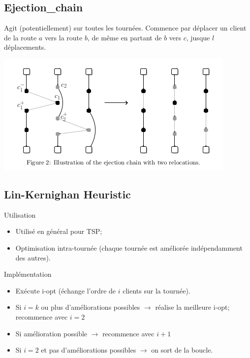 \documentclass{beamer}
\begin{document}
\subsection{Ejection\_chain}
\begin{frame}
Agit (potentiellement) sur toutes les tournées. Commence par déplacer un client de la route $a$ vers la route $b$, de même en partant de $b$ vers $c$, jusque $l$ déplacements. 

	\centering
	\includegraphics[height=0.4\textheight]{ejection_chain.png}
\end{frame}


\subsection{Lin-Kernighan Heuristic}
\begin{frame}

\begin{block}{Utilisation}
\begin{itemize}
\item Utilisé en général pour TSP;
\item Optimisation intra-tournée (chaque tournée est améliorée indépendamment des autres).
\end{itemize}
\end{block}

\begin{exampleblock}{Implémentation}
\begin{itemize}
\item Exécute i-opt (échange l'ordre de $i$ clients sur la tournée).
\item Si $i=k$ ou plus d'améliorations possibles $\rightarrow$ réalise la meilleure i-opt; recommence avec $i=2$
\item Si amélioration possible $\rightarrow$ recommence avec $i+1$
\item Si $i=2$ et pas d'améliorations possibles $\rightarrow$ on sort de la boucle.
\end{itemize}
\end{exampleblock}

\end{frame} 
\end{document}
